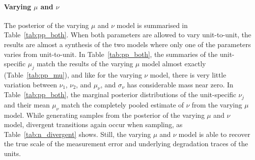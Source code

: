 \paragraph{Varying $\mu$ and $\nu$} The posterior of the varying $\mu$ and $\nu$ model is summarised in Table~\ref{tab:pp_both}. When both parameters are allowed to vary unit-to-unit, the results are almost a synthesis of the two models where only one of the parameters varies from unit-to-unit. In Table~\ref{tab:pp_both}, the summaries of the unit-specific $\mu_j$ match the results of the varying $\mu$ model almost exactly (Table~\ref{tab:pp_mu}), and like for the varying $\nu$ model, there is very little variation between $\nu_1$, $\nu_2$, and $\mu_\nu$, and $\sigma_\nu$ has considerable mass near zero. In Table~\ref{tab:pp_both}, the marginal posterior distributions of the unit-specific $\nu_j$ and their mean $\mu_\nu$ match the completely pooled estimate of $\nu$ from the varying $\mu$ model. While generating samples from the posterior of the varying $\mu$ and $\nu$ model, divergent transitions again occur when sampling, as Table~\ref{tab:n_divergent} shows. Still, the varying $\mu$ and $\nu$ model is able to recover the true scale of the measurement error and underlying degradation traces of the units.



